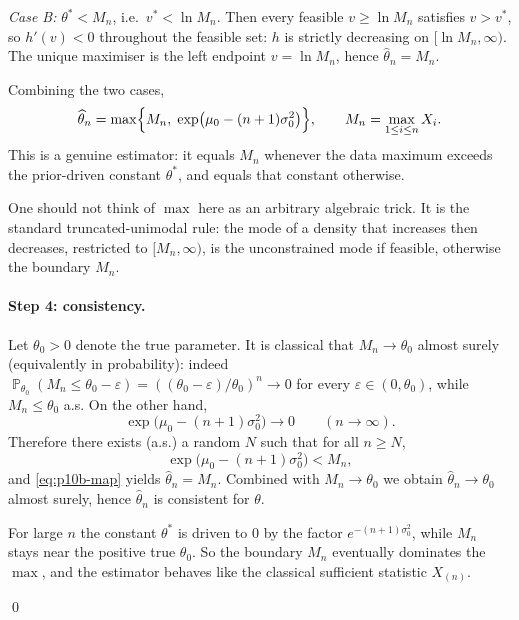 \documentclass[11pt,a4paper]{article}
\DeclareMathOperator{\Pbb}{\mathbb{P}}
\begin{document}
\textit{Case B:} \(\theta^*<M_n\), i.e.\ \(v^*<\ln M_n\). Then every feasible \(v\ge\ln M_n\) satisfies \(v>v^*\), so \(h'(v)<0\) throughout the feasible set: \(h\) is strictly decreasing on \([\ln M_n,\infty)\). The unique maximiser is the left endpoint \(v=\ln M_n\), hence \(\widehat\theta_n=M_n\).

Combining the two cases,
\begin{equation}
\label{eq:p10b-map}
\widehat\theta_n
=
\max\Bigl\{
M_n,\;
\exp\bigl(\mu_0-(n+1)\sigma_0^2\bigr)
\Bigr\},
\qquad
M_n=\max_{1\le i\le n}X_i.
\end{equation}
This is a genuine estimator: it equals \(M_n\) whenever the data maximum exceeds the prior-driven constant \(\theta^*\), and equals that constant otherwise.

\begin{remark*}
One should not think of \(\max\) here as an arbitrary algebraic trick. It is the standard truncated-unimodal rule: the mode of a density that increases then decreases, restricted to \([M_n,\infty)\), is the unconstrained mode if feasible, otherwise the boundary \(M_n\).
\end{remark*}

\paragraph{Step 4: consistency.}
Let \(\theta_0>0\) denote the true parameter. It is classical that \(M_n\to\theta_0\) almost surely (equivalently in probability): indeed \(\Pbb_{\theta_0}(M_n\le\theta_0-\varepsilon)=((\theta_0-\varepsilon)/\theta_0)^n\to 0\) for every \(\varepsilon\in(0,\theta_0)\), while \(M_n\le\theta_0\) a.s. On the other hand,
\[
\exp\bigl(\mu_0-(n+1)\sigma_0^2\bigr)\to 0
\qquad(n\to\infty).
\]
Therefore there exists (a.s.) a random \(N\) such that for all \(n\ge N\),
\[
\exp\bigl(\mu_0-(n+1)\sigma_0^2\bigr)
<
M_n,
\]
and \eqref{eq:p10b-map} yields \(\widehat\theta_n=M_n\). Combined with \(M_n\to\theta_0\) we obtain \(\widehat\theta_n\to\theta_0\) almost surely, hence \(\widehat\theta_n\) is consistent for \(\theta\).

\begin{remark*}
For large \(n\) the constant \(\theta^*\) is driven to \(0\) by the factor \(e^{-(n+1)\sigma_0^2}\), while \(M_n\) stays near the positive true \(\theta_0\). So the boundary \(M_n\) eventually dominates the \(\max\), and the estimator behaves like the classical sufficient statistic \(X_{(n)}\).
\end{remark*}
\qed
\end{document}
